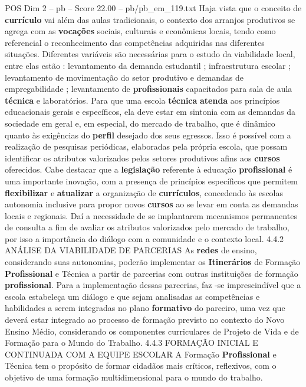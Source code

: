\begin{textsample}{POS Dim 2 – pb – Score 22.00 – pb/pb\_em\_119.txt}
Haja vista que o conceito de \textbf{currículo} vai além das aulas tradicionais, o contexto dos arranjos produtivos se agrega com as \textbf{vocações} sociais, culturais e econômicas locais, tendo como referencial o reconhecimento das competências adquiridas nas diferentes situações.
Diferentes variáveis são necessárias para o estudo da viabilidade local, entre elas estão : levantamento da demanda estudantil ; infraestrutura escolar ; levantamento de movimentação do setor produtivo e demandas de empregabilidade ; levantamento de \textbf{profissionais} capacitados para sala de aula \textbf{técnica} e laboratórios.
Para que uma escola \textbf{técnica} \textbf{atenda} aos princípios educacionais gerais e específicos, ela deve estar em sintonia com as demandas da sociedade em geral e, em especial, do mercado de trabalho, que é dinâmico quanto às exigências do \textbf{perfil} desejado dos seus egressos.
Isso é possível com a realização de pesquisas periódicas, elaboradas pela própria escola, que possam identificar os atributos valorizados pelos setores produtivos afins aos \textbf{cursos} oferecidos.
Cabe destacar que a \textbf{legislação} referente à educação \textbf{profissional} é uma importante inovação, com a presença de princípios específicos que permitem \textbf{flexibilizar} e \textbf{atualizar} a organização de \textbf{currículos}, concedendo às escolas autonomia inclusive para propor novos \textbf{cursos} ao se levar em conta as demandas locais e regionais.
Daí a necessidade de se implantarem mecanismos permanentes de consulta a fim de avaliar os atributos valorizados pelo mercado de trabalho, por isso a importância do diálogo com a comunidade e o contexto local. 4.4.2 ANÁLISE DA VIABILIDADE DE PARCERIAS As \textbf{redes} de ensino, considerando suas autonomias, poderão implementar os \textbf{Itinerários} de Formação \textbf{Profissional} e Técnica a partir de parcerias com outras instituições de formação \textbf{profissional}.
Para a implementação dessas parcerias, faz -se imprescindível que a escola estabeleça um diálogo e que sejam analisadas as competências e habilidades a serem integradas no plano \textbf{formativo} do parceiro, uma vez que deverá estar integrado ao processo de formação previsto no contexto do Novo Ensino Médio, considerando os componentes curriculares de Projeto de Vida e de Formação para o Mundo do Trabalho. 4.4.3 FORMAÇÃO INICIAL E CONTINUADA COM A EQUIPE ESCOLAR A Formação \textbf{Profissional} e Técnica tem o propósito de formar cidadãos mais críticos, reflexivos, com o objetivo de uma formação multidimensional para o mundo do trabalho.

\end{textsample}
